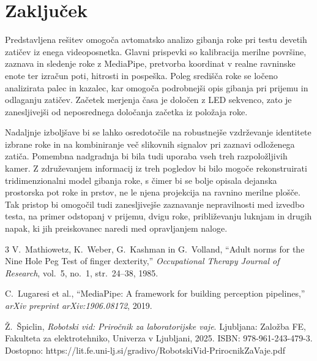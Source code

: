 \documentclass[journal,a4paper,twoside]{sty/IEEEtran}
\begin{document}
\section{Zaključek}

Predstavljena rešitev omogoča avtomatsko analizo gibanja roke pri testu devetih zatičev iz enega videoposnetka. Glavni prispevki so kalibracija merilne površine, zaznava in sledenje roke z MediaPipe, pretvorba koordinat v realne ravninske enote ter izračun poti, hitrosti in pospeška. Poleg središča roke se ločeno analizirata palec in kazalec, kar omogoča podrobnejši opis gibanja pri prijemu in odlaganju zatičev. Začetek merjenja časa je določen z LED sekvenco, zato je zanesljivejši od neposrednega določanja začetka iz položaja roke.

Nadaljnje izboljšave bi se lahko osredotočile na robustnejše vzdrževanje identitete izbrane roke in na kombiniranje več slikovnih signalov pri zaznavi odloženega zatiča. Pomembna nadgradnja bi bila tudi uporaba vseh treh razpoložljivih kamer. Z združevanjem informacij iz treh pogledov bi bilo mogoče rekonstruirati tridimenzionalni model gibanja roke, s čimer bi se bolje opisala dejanska prostorska pot roke in prstov, ne le njena projekcija na ravnino merilne plošče. Tak pristop bi omogočil tudi zanesljivejše zaznavanje nepravilnosti med izvedbo testa, na primer odstopanj v prijemu, dvigu roke, približevanju luknjam in drugih napak, ki jih preiskovanec naredi med opravljanjem naloge.

\begin{thebibliography}{3}
V.~Mathiowetz, K.~Weber, G.~Kashman in G.~Volland, ``Adult norms for the Nine Hole Peg Test of finger dexterity,'' {\em Occupational Therapy Journal of Research}, vol.~5, no.~1, str.~24--38, 1985.

C.~Lugaresi et al., ``MediaPipe: A framework for building perception pipelines,'' {\em arXiv preprint arXiv:1906.08172}, 2019.

Ž.~Špiclin, \emph{Robotski vid: Priročnik za laboratorijske vaje}.
Ljubljana: Založba FE, Fakulteta za elektrotehniko, Univerza v Ljubljani, 2025.
ISBN: 978-961-243-479-3. Dostopno: https://lit.fe.uni-lj.si/gradivo/RobotskiVid-PrirocnikZaVaje.pdf


\end{thebibliography}

\vfill

\label{finish}
\end{document}
